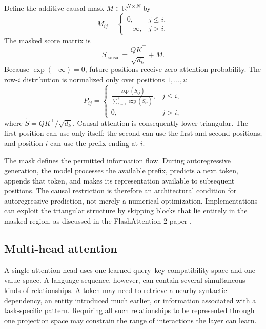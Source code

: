 Define the additive causal mask \(M\in\mathbb{R}^{N\times N}\) by
\begin{equation}
    M_{ij}
    =
    \begin{cases}
        0, & j\leq i,\\
        -\infty, & j>i.
    \end{cases}
    \label{eq:attn-causal-mask}
\end{equation}
The masked score matrix is
\begin{equation}
    S_{\mathrm{causal}}
    =
    \frac{QK^\top}{\sqrt{d_k}}+M.
    \label{eq:attn-causal-scores}
\end{equation}
Because \(\exp(-\infty)=0\), future positions receive zero attention
probability. The row-\(i\) distribution is normalized only over positions
\(1,\ldots,i\):
\begin{equation}
    P_{ij}
    =
    \begin{cases}
        \displaystyle
        \frac{\exp(\widetilde S_{ij})}
             {\sum_{r=1}^{i}\exp(\widetilde S_{ir})},
        & j\leq i,\\[10pt]
        0, & j>i,
    \end{cases}
    \label{eq:attn-causal-probabilities}
\end{equation}
where \(\widetilde S=QK^\top/\sqrt{d_k}\). Causal attention is consequently
lower triangular. The first position can use only itself; the second can
use the first and second positions; and position \(i\) can use the prefix
ending at \(i\).

The mask defines the permitted information flow. During autoregressive
generation, the model processes the available prefix, predicts a next
token, appends that token, and makes its representation available to
subsequent positions. The causal restriction is therefore an architectural
condition for autoregressive prediction, not merely a numerical
optimization. Implementations can exploit the triangular structure by
skipping blocks that lie entirely in the masked region, as discussed in
the FlashAttention-2 paper \parencite{dao2023flashattention2}.

\subsection{Multi-head attention}
\label{subsec:attn-multi-head}

A single attention head uses one learned query--key compatibility space and
one value space. A language sequence, however, can contain several
simultaneous kinds of relationships. A token may need to retrieve a nearby
syntactic dependency, an entity introduced much earlier, or information
associated with a task-specific pattern. Requiring all such relationships
to be represented through one projection space may constrain the range of
interactions the layer can learn.

